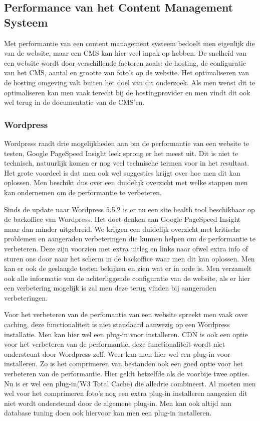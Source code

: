 \subsection{Performance van het Content Management Systeem}
Met performantie van een content management systeem bedoelt men eigenlijk die van de website, maar een CMS kan hier veel inpak op hebben. De snelheid van een website wordt door verschillende factoren zoals: de hosting, de configuratie van het CMS, aantal en grootte van foto's op de website. Het optimaliseren van de hosting omgeving valt buiten het doel van dit onderzoek. Als men wenst dit te optimaliseren kan men vaak terecht bij de hostingprovider en men vindt dit ook wel terug in de documentatie van de CMS'en.

\subsubsection{Wordpress}
Wordpress raadt drie mogelijkheden aan om de performantie van een website te testen, Google PageSpeed Insight leek sprong er het meest uit. Dit is niet te technisch, natuurlijk komen er nog veel technische termen voor in het resultaat. Het grote voordeel is dat men ook wel suggesties krijgt over hoe men dit kan oplossen. Men beschikt dus over een duidelijk overzicht met welke stappen men kan ondernemen om de performantie te verbeteren.

Sinds de update naar Wordpress 5.5.2 is er nu een site health tool beschikbaar op de backoffice van Wordpress. Het doet denken aan Google PageSpeed Insight maar dan minder uitgebreid. We krijgen een duidelijk overzicht met kritische problemen en aangeraden verbeteringen die kunnen helpen om de performantie te verbeteren. Deze zijn voorzien met extra uitleg en links naar ofwel extra info of sturen ons door naar het scherm in de backoffice waar men dit kan oplossen. Men kan er ook de geslaagde testen bekijken en zien wat er in orde is. Men verzamelt ook alle informatie van de achterliggende configuratie van de website, als er hier een verbetering mogelijk is zal men deze terug vinden bij aangeraden verbeteringen.

Voor het verbeteren van de perfomantie van een website spreekt men vaak over caching, deze functionaliteit is niet standaard aanwezig op een Wordpress installatie. Men kan hier wel een plug-in voor installeren. CDN is ook een optie voor het verbeteren van de performantie, deze functionaliteit wordt niet ondersteunt door Wordpress zelf. Weer kan men hier wel een plug-in voor installeren. Zo is het comprimeren van bestanden ook een goed optie voor het verbeteren van de performantie. Hier geldt hetzelfde als de voorbije twee opties. Nu is er wel een plug-in(W3 Total Cache) die alledrie combineert. Al moeten men wel voor het comprimeren foto's nog een extra plug-in installeren aangezien dit niet wordt ondersteund door de algemene plug-in. Men kan ook altijd aan database tuning doen ook hiervoor kan men een plug-in installeren.

